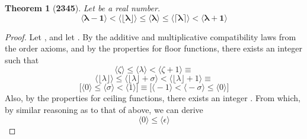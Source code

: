 \documentclass[preview]{standalone}
\newtheorem{theorem}{Theorem}
\begin{document}
\begin{theorem}[\textbf{2345}]
    Let \bm{$\lambda$} be a real number. 
    \begin{equation*}
        \bm{
            \big \langle \lambda - 1 \big \rangle
                < 
            \big \langle \lfloor \lambda \rfloor \big \rangle
                \leq 
            \big \langle \lambda \big \rangle
                \leq
            \big \langle \lceil \lambda \rceil \big \rangle
                <
            \big \langle \lambda + 1 \big \rangle
        }
    \end{equation*}
\end{theorem}

\begin{proof}
    Let \bm{$\lambda - \lfloor \lambda \rfloor = \sigma$}, 
    and let \bm{$\lceil \lambda \rceil - \lambda = \epsilon$}.
    By the additive and multiplicative compatibility laws from the order axioms,
    and by the properties for floor functions,
    there exists an integer \bm{$\lfloor \lambda \rfloor = \zeta$} such that
    \begin{equation*}
        \Big \langle \zeta \Big \rangle 
            \leq 
        \Big \langle \lambda \Big \rangle
            <
        \Big \langle \zeta + 1 \Big \rangle
            \equiv
    \end{equation*}
    \begin{equation*}
        \Big \langle \lfloor \lambda \rfloor \Big \rangle
            \leq 
        \Big \langle \lfloor \lambda \rfloor + \sigma \Big \rangle 
            < 
        \Big \langle \lfloor \lambda \rfloor + 1 \Big \rangle
            \equiv
    \end{equation*}
    \begin{equation*}
        \bigg[
            \Big \langle 0 \Big \rangle 
                \leq 
            \Big \langle \sigma \Big \rangle 
                < 
            \Big \langle 1 \Big \rangle
        \bigg]
            \equiv
        \bigg[
            \Big \langle -1 \Big \rangle
                <
            \Big \langle - \sigma \Big \rangle
                \leq
            \Big \langle 0 \Big \rangle
        \bigg]
    \end{equation*}
    Also, by the properties for ceiling functions,
    there exists an integer \bm{$\lceil \lambda \rceil = \xi$}.
    From which, by similar reasoning as to that of above,
    we can derive
    \begin{equation*}
        \Big \langle 0 \Big \rangle
            \leq
        \Big \langle \epsilon \Big \rangle

\end{equation*}
\end{proof}
\end{document}
